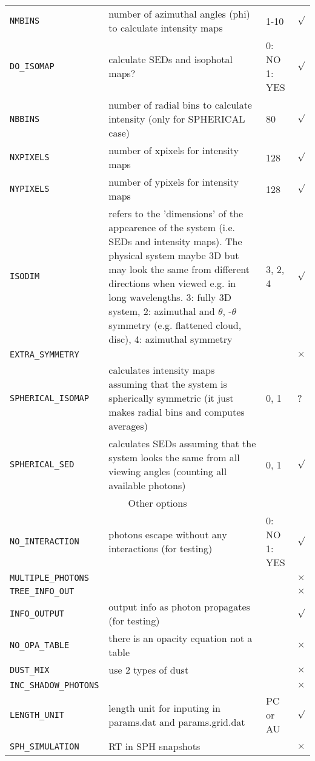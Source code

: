\documentclass[12pt,a4paper]{article}
\begin{document}
{\begin{tabular}{|p{3.2cm}|p{9.5cm}|p{3.9cm}|p{0.3cm}|}
\texttt{NMBINS}& number of azimuthal angles (phi) to calculate intensity maps & 1-10 &$\surd$\\
\texttt{DO\_ISOMAP} & calculate SEDs and isophotal maps? & 0: NO 1: YES&  $\surd$ \\
\texttt{NBBINS} & number of radial bins to calculate intensity (only for SPHERICAL case) & 80 & $\surd$\\
\texttt{NXPIXELS} & number of xpixels for intensity maps & 128 &  $\surd$\\
\texttt{NYPIXELS}& number of ypixels for intensity maps & 128 &  $\surd$\\
\texttt{ISODIM}& refers to the 'dimensions' of the appearence of the system (i.e. SEDs and intensity maps). The physical system maybe 3D but may look the same from different directions when viewed e.g. in long wavelengths.  3: fully 3D system, 2: azimuthal  and $\theta$, -$\theta$ symmetry (e.g. flattened cloud, disc), 4: azimuthal symmetry & 3, 2, 4 & $\surd$\\
\texttt{EXTRA\_SYMMETRY}& & & $\times$ \\
\texttt{SPHERICAL\_ISOMAP}& calculates intensity maps assuming that the system is spherically symmetric (it just makes radial bins and computes averages) &  0, 1 & ? \\
\texttt{SPHERICAL\_SED}& calculates SEDs assuming that the system looks the same from all viewing angles (counting all available photons) &  0, 1 & $\surd$ \\

\hline
\multicolumn{4}{|c|}{Other options}\\
\hline
\texttt{NO\_INTERACTION }& photons escape without any interactions (for testing) &0: NO 1: YES &$\surd$ \\
\texttt{MULTIPLE\_PHOTONS}& & & $\times$ \\
\texttt{TREE\_INFO\_OUT}& & & $\times$ \\
\texttt{INFO\_OUTPUT }& output info as photon propagates (for testing) & & $\surd$ \\
\texttt{NO\_OPA\_TABLE }& there is an opacity equation not a table & & $\times$ \\
\texttt{DUST\_MIX}& use 2 types of dust & & $\times$ \\
\texttt{INC\_SHADOW\_PHOTONS}& & & $\times$ \\
\texttt{LENGTH\_UNIT}& length unit for inputing in params.dat and params.grid.dat & PC or AU & $\surd$\\
\texttt{SPH\_SIMULATION}& RT in SPH snapshots & & $\times$ \\
\hline
\end{tabular}
\par}
\end{document}
